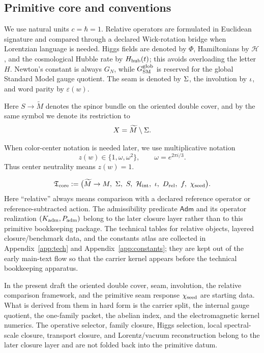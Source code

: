 \subsection{Primitive core and conventions}

We use natural units $c=\hbar=1$. Relative operators are formulated in Euclidean signature and compared through a declared Wick-rotation bridge when Lorentzian language is needed. Higgs fields are denoted by $\Phi$, Hamiltonians by $\mathcal H$, and the cosmological Hubble rate by $H_{\mathrm{hub}}(t)$; this avoids overloading the letter $H$. Newton's constant is always $G_N$, while $G_{\mathrm{SM}}^{\mathrm{glob}}$ is reserved for the global Standard Model gauge quotient. The seam is denoted by $\Sigma$, the involution by $\iota$, and word parity by $\varepsilon(w)$.

Here $S\to \widetilde M$ denotes the spinor bundle on the oriented double cover, and by the same symbol we denote its restriction to
\[
X=\widetilde M\setminus\Sigma.
\]

When color-center notation is needed later, we use multiplicative notation
\[
z(w)\in\{1,\omega,\omega^2\},
\qquad
\omega=e^{2\pi i/3}.
\]
Thus center neutrality means $z(w)=1$.

\[
\Tcore
:=
\bigl(
\widetilde M\to M,\ \Seam,\ S,\ \Hint,\ \inv,\ D_{\mathrm{rel}},\ f,\ \chiseed
\bigr).
\]
Here \enquote{relative} always means comparison with a declared reference operator or reference-subtracted action. The admissibility predicate $\mathsf{Adm}$ and its operator realization $(K_{\mathrm{adm}},P_{\mathrm{adm}})$ belong to the later closure layer rather than to this primitive bookkeeping package. The technical tables for relative objects, layered closure/benchmark data, and the constants atlas are collected in Appendix~\ref{app:tech} and Appendix~\ref{app:constants}; they are kept out of the early main-text flow so that the carrier kernel appears before the technical bookkeeping apparatus.

\begin{remark}
In the present draft the oriented double cover, seam, involution, the relative comparison framework, and the primitive seam response $\chi_{\mathrm{seed}}$ are starting data. What is derived from them in hard form is the carrier split, the internal gauge quotient, the one-family packet, the abelian index, and the electromagnetic kernel numerics. The operative selector, family closure, Higgs selection, local spectral-scale closure, transport closure, and Lorentz/vacuum reconstruction belong to the later closure layer and are not folded back into the primitive datum.
\end{remark}

